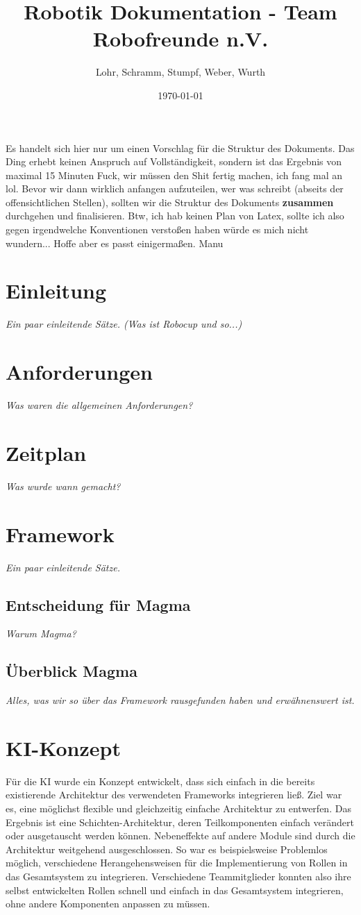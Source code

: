 \documentclass[fontsize=12pt,a4paper,draft]{scrartcl}[2003/01/01]
\title{Robotik Dokumentation - Team Robofreunde n.V.}
\author{Lohr, Schramm, Stumpf, Weber, Wurth}
\date{\today}
\begin{document}
Es handelt sich hier nur um einen Vorschlag für die Struktur des Dokuments. Das Ding erhebt keinen Anspruch auf Vollständigkeit, sondern ist das Ergebnis von maximal 15 Minuten \glqq Fuck, wir müssen den Shit fertig machen, ich fang mal an lol\grqq. Bevor wir dann wirklich anfangen aufzuteilen, wer was schreibt (abseits der offensichtlichen Stellen), sollten wir die Struktur des Dokuments \textbf{zusammen} durchgehen und finalisieren. Btw, ich hab keinen Plan von Latex, sollte ich also gegen irgendwelche Konventionen verstoßen haben würde es mich nicht wundern... Hoffe aber es passt einigermaßen. Manu

\maketitle
\tableofcontents

\section{Einleitung}
\textit{Ein paar einleitende Sätze. (Was ist Robocup und so...)}
\section{Anforderungen}
\textit{Was waren die allgemeinen Anforderungen?}
\section{Zeitplan}
\textit{Was wurde wann gemacht?}
\section{Framework}
\textit{Ein paar einleitende Sätze.}
\subsection{Entscheidung für Magma}
\textit{Warum Magma?}
\subsection{Überblick Magma}
\textit{Alles, was wir so über das Framework rausgefunden haben und erwähnenswert ist.}

\section{KI-Konzept}
Für die KI wurde ein Konzept entwickelt, dass sich einfach in die bereits existierende Architektur des verwendeten Frameworks integrieren ließ. Ziel war es, eine möglichst flexible und gleichzeitig einfache Architektur zu entwerfen. Das Ergebnis ist eine Schichten-Architektur, deren Teilkomponenten einfach verändert oder ausgetauscht werden können. Nebeneffekte auf andere Module sind durch die Architektur weitgehend ausgeschlossen. So war es beispielsweise Problemlos möglich, verschiedene Herangehensweisen für die Implementierung von Rollen in das Gesamtsystem zu integrieren. Verschiedene Teammitglieder konnten also ihre selbst entwickelten Rollen schnell und einfach in das Gesamtsystem integrieren, ohne andere Komponenten anpassen zu müssen.
\end{document}
